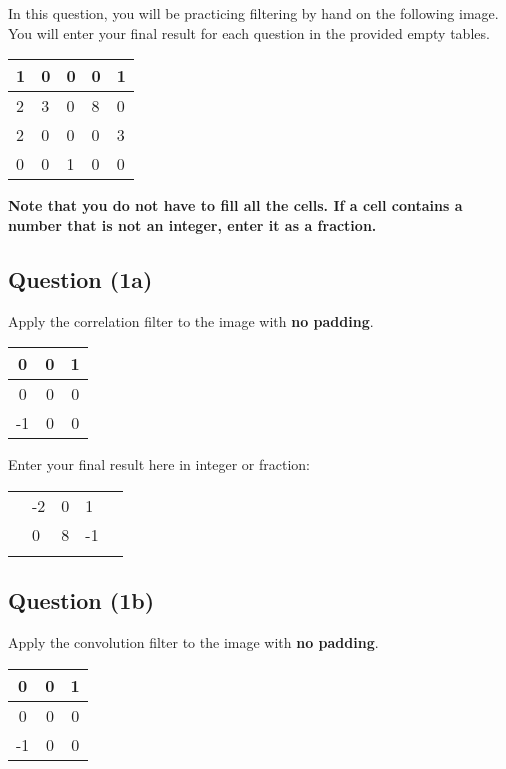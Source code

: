 \documentclass[12pt]{article}
\begin{document}

\noindent In this question, you will be practicing filtering by hand on the following image. You will enter your final result for each question in the provided empty tables.

\begin{center}
\begin{tabular}{|l|l|l|l|l|}
\hline
1 & 0 & 0 & 0 & 1 \\ \hline
2 & 3 & 0 & 8 & 0 \\ \hline
2 & 0 & 0 & 0 & 3 \\ \hline
0 & 0 & 1 & 0 & 0 \\ \hline
\end{tabular}
\end{center}
\textbf{Note that you do not have to fill all the cells. If a cell contains a number that is not an integer, enter it as a fraction.}

\subsection*{Question (1a)} Apply the correlation filter to the image with \textbf{no padding}.
\begin{center}
\begin{tabular}{|c|c|c|}
\hline
0  & 0 & 1 \\ \hline
0  & 0 & 0 \\ \hline
-1 & 0 & 0 \\ \hline
\end{tabular}
\end{center}

\noindent Enter your final result here in integer or fraction:

\begin{center}
\begin{tabular}{|l|l|l|l|l|}
\hline
 &  &  &  &  \\ \hline
 & -2 & 0 & 1 &  \\ \hline
 & 0 & 8 & -1 &  \\ \hline
 &  &  & &  \\ \hline
\end{tabular}
\end{center}

\subsection*{Question (1b)} Apply the convolution filter to the image with \textbf{no padding}.
\begin{center}
\begin{tabular}{|c|c|c|}
\hline
0  & 0 & 1 \\ \hline
0  & 0 & 0 \\ \hline
-1 & 0 & 0 \\ \hline
\end{tabular}
\end{center}
\end{document}
